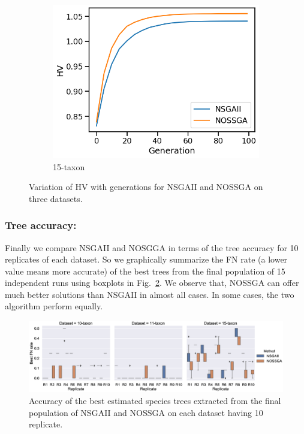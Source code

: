 \begin{figure}[!htbp]
\begin{adjustwidth}{-1cm}{-1cm}
\begin{subfigure}[b]{0.4\textwidth}
			\includegraphics[width=\textwidth]{Figure/15-taxon_hv}
			\caption{15-taxon}
		\end{subfigure}
		\caption{Variation of HV with generations for NSGAII and NOSSGA on three datasets.}
		\label{fig:gen_wise_hv}
	\end{adjustwidth}
\end{figure}
\subsubsection{Tree accuracy:} Finally we compare NSGAII and NOSGGA in terms of the tree accuracy for 10 replicates of each dataset. So we graphically summarize the FN rate (a lower value means more accurate) of the best trees from the final population of 15 independent runs using boxplots in Fig.~\ref{fig:emo_compare}. We observe that, NOSSGA can offer much better solutions than NSGAII in almost all cases. In some cases, the two algorithm perform equally.
\begin{figure}
	\centering
	\begin{adjustwidth}{-2cm}{-2cm}
		\includegraphics[width=1.5\textwidth]{Figure/emo_boxplot}
		\caption{Accuracy of the best estimated species trees extracted from the final population of NSGAII and NOSSGA on each dataset having 10 replicate.} \label{fig:emo_compare}
	\end{adjustwidth}
\end{figure}

